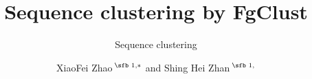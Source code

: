 \documentclass{bioinfo}
\begin{document}

\subtitle{Sequence clustering}

\title[FgClust]{
	Sequence clustering by FgClust
}
\author[XiaoFei Zhao \textit{et~al}.]{
	XiaoFei Zhao\,$^{\text{\sfb 1,}*}$
	and Shing Hei Zhan\,$^{\text{\sfb 1,}}$}
\address{$^{\text{\sf 1}}$Bioinformatics Department, Fusion Genomics Corporation, Burnaby, V5A 4W9, Canada 
}



\end{document}
